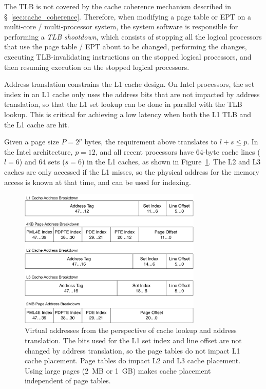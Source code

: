 
The TLB is not covered by the cache coherence mechanism described in
\S~\ref{sec:cache_coherence}. Therefore, when modifying a page table or EPT on
a multi-core / multi-processor system, the system software is responsible for
performing a \textit{TLB shootdown}, which consists of stopping all the logical
processors that use the page table / EPT about to be changed, performing the
changes, executing TLB-invalidating instructions on the stopped logical
processors, and then resuming execution on the stopped logical processors.

Address translation constrains the L1 cache design. On Intel processors, the
set index in an L1 cache only uses the address bits that are not impacted by
address translation, so that the L1 set lookup can be done in parallel with the
TLB lookup. This is critical for achieving a low latency when both the L1 TLB
and the L1 cache are hit.

Given a page size $P = 2^{p}$ bytes, the requirement above translates to
$l + s \le p$. In the Intel architecture, $p = 12$, and all recent processors
have 64-byte cache lines ($l = 6$) and 64 sets ($s = 6$) in the L1 caches, as
shown in Figure~\ref{fig:caching_and_paging}. The L2 and L3 caches are only
accessed if the L1 misses, so the physical address for the memory access is
known at that time, and can be used for indexing.

\begin{figure}[hbt]
  \centering
  \includegraphics[width=87mm]{figures/caching_and_paging.pdf}
  \caption{
    Virtual addresses from the perspective of cache lookup and address
    translation. The bits used for the L1 set index and line offset are not
    changed by address translation, so the page tables do not impact L1 cache
    placement. Page tables do impact L2 and L3 cache placement. Using large
    pages (2~MB or 1~GB) makes cache placement independent of page tables.
  }
  \label{fig:caching_and_paging}
\end{figure}
